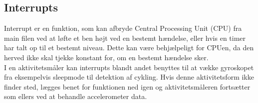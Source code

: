 \subsection{Interrupts}
Interrupt er en funktion, som kan afbryde Central Processing Unit (CPU) fra main filen ved at løfte et ben højt ved en bestemt hændelse, eller hvis en timer har talt op til et bestemt niveau. Dette kan være behjælpeligt for CPUen, da den herved ikke skal tjekke konstant for, om en bestemt hændelse sker. \citep{Badiger2016} \\
I en aktivitetsmåler kan interrupts blandt andet benyttes til at vække gyroskopet fra eksempelvis sleepmode til detektion af cykling. Hvis denne aktivitetsform ikke finder sted, lægges benet for funktionen ned igen og aktivitetsmåleren fortsætter som ellers ved at behandle accelerometer data.

